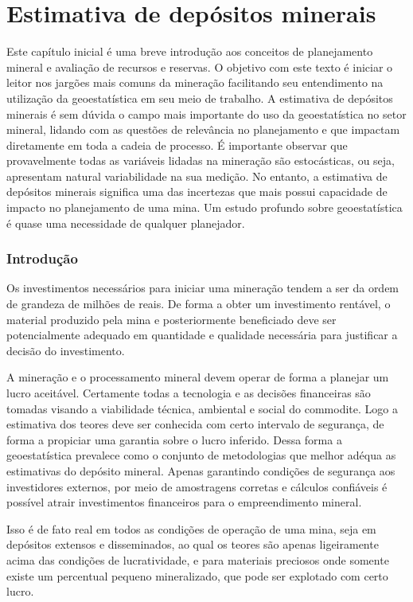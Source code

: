 

\chapter{Estimativa de depósitos minerais}



Este capítulo inicial é uma breve introdução aos conceitos de planejamento mineral e avaliação de recursos e reservas. O objetivo com este texto é iniciar o leitor nos jargões mais comuns da mineração facilitando seu entendimento na utilização da geoestatística em seu meio de trabalho. A estimativa de depósitos minerais é sem dúvida o campo mais importante do uso da geoestatística no setor mineral, lidando com as questões de relevância no planejamento e que impactam diretamente em toda a cadeia de processo. É importante observar que provavelmente todas as variáveis lidadas na mineração são estocásticas, ou seja, apresentam natural variabilidade na sua medição. No entanto, a estimativa de depósitos minerais significa uma das incertezas que mais possui capacidade de impacto no planejamento de uma mina. Um estudo profundo sobre geoestatística é quase uma necessidade de qualquer planejador.   

\subsection{Introdução}

Os investimentos necessários para iniciar uma mineração tendem a ser da ordem de grandeza de milhões de reais. De forma a obter um investimento rentável, o material produzido pela mina e posteriormente beneficiado deve ser potencialmente adequado em quantidade e qualidade necessária para justificar a decisão do investimento.

 A mineração e o processamento mineral devem operar de forma a planejar um lucro aceitável. Certamente todas a tecnologia e as decisões financeiras são tomadas visando a viabilidade técnica, ambiental e social do commodite. Logo a estimativa dos teores  deve ser conhecida com certo intervalo de segurança, de forma a propiciar uma garantia sobre o lucro inferido. Dessa forma a geoestatística prevalece como o conjunto de metodologias que melhor adéqua as estimativas do depósito mineral.  Apenas garantindo condições de segurança aos investidores externos, por meio de amostragens corretas e cálculos confiáveis é possível atrair investimentos financeiros para o empreendimento mineral. 
 
Isso é de fato real em todos as condições de operação de uma mina, seja em depósitos extensos e disseminados, ao qual os teores são apenas ligeiramente acima das condições de lucratividade, e para materiais preciosos onde somente existe um percentual pequeno mineralizado, que pode ser explotado com certo lucro. 
 
